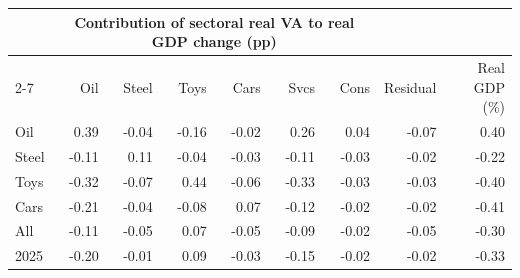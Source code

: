 \begin{tabular}{lrrrrrrrr}
\toprule
 & \multicolumn{6}{c}{Contribution of sectoral real VA to real GDP change (pp)} & & \\
\cmidrule(lr){2-7}
 & Oil & Steel & Toys & Cars & Svcs & Cons & Residual & Real GDP (\%) \\
\midrule
Oil & 0.39 & -0.04 & -0.16 & -0.02 & 0.26 & 0.04 & -0.07 & 0.40 \\
Steel & -0.11 & 0.11 & -0.04 & -0.03 & -0.11 & -0.03 & -0.02 & -0.22 \\
Toys & -0.32 & -0.07 & 0.44 & -0.06 & -0.33 & -0.03 & -0.03 & -0.40 \\
Cars & -0.21 & -0.04 & -0.08 & 0.07 & -0.12 & -0.02 & -0.02 & -0.41 \\
All & -0.11 & -0.05 & 0.07 & -0.05 & -0.09 & -0.02 & -0.05 & -0.30 \\
2025 & -0.20 & -0.01 & 0.09 & -0.03 & -0.15 & -0.02 & -0.02 & -0.33 \\
\bottomrule
\end{tabular}

